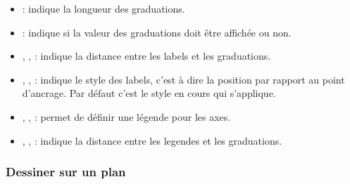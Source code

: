 \begin{itemize}
    \item {} : indique la longueur des graduations.

    \item {} : indique si la valeur des graduations doit être affichée ou non.
    
    \item {}, ,  : indique la distance entre les labels et les graduations.
    
    \item {}, ,  : indique le style des labels, c'est à dire la position par rapport au point d'ancrage. Par défaut c'est le style en cours qui s'applique.

    \item {}, ,  : permet de définir une légende pour les axes.
    
    \item {}, ,  : indique la distance entre les legendes et les graduations.     
\end{itemize}

\subsubsection{Dessiner sur un plan}


